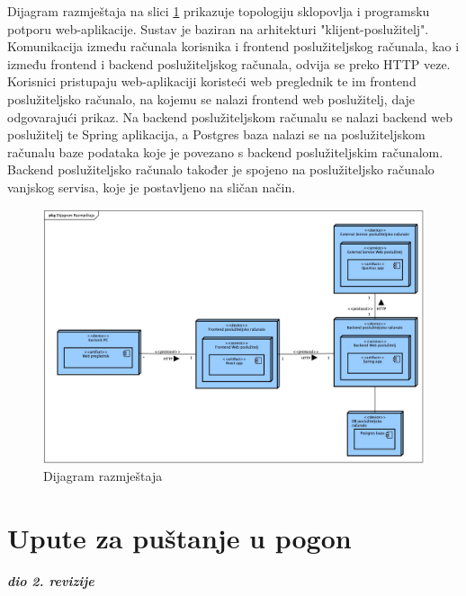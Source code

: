 			
			Dijagram razmještaja na slici \ref{fig:implementacija_dijagram_razmjestaja} prikazuje topologiju sklopovlja i programsku potporu web-aplikacije. Sustav je baziran na arhitekturi "klijent-poslužitelj". Komunikacija između računala korisnika i frontend poslužiteljskog računala, kao i između frontend i backend poslužiteljskog računala, odvija se preko HTTP veze. Korisnici pristupaju web-aplikaciji koristeći web preglednik te im frontend poslužiteljsko računalo, na kojemu se nalazi frontend web poslužitelj, daje odgovarajući prikaz. Na backend poslužiteljskom računalu se nalazi backend web poslužitelj te Spring aplikacija, a Postgres baza nalazi se na poslužiteljskom računalu baze podataka koje je povezano s backend poslužiteljskim računalom. Backend poslužiteljsko računalo također je spojeno na poslužiteljsko računalo vanjskog servisa, koje je postavljeno na sličan način.
			
			\begin{figure}[H]
				\includegraphics[scale=0.23]{slike/implementacija_dijagram_razmjestaja.jpg} %
				\centering
				\caption{Dijagram razmještaja}
				\label{fig:implementacija_dijagram_razmjestaja}
			\end{figure}
			
			\eject 
		
		\section{Upute za puštanje u pogon}
		
			\textbf{\textit{dio 2. revizije}}\\
		
